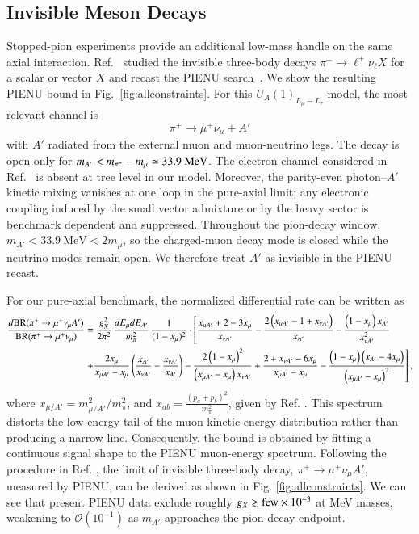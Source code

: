 \documentclass[onecolumn, aps, nofootinbib, prd, preprint, floats, floatfix, amsmath, amssymb, superscriptaddress, preprintnumbers]{revtex4-2}
\begin{document}
\subsection{Invisible Meson Decays}
\label{subsec:pion-invisible}

Stopped-pion experiments provide an additional low-mass handle on the same axial interaction. Ref.~\cite{Altmannshofer:2026opc} studied the invisible three-body decays $\pi^+\to \ell^+\nu_\ell X$ for a scalar or vector $X$ and recast the PIENU search~\cite{PIENU:2021clt}. We show the resulting PIENU bound in Fig.~\ref{fig:allconstraints}. For this $U_A(1)_{L_\mu-L_\tau}$ model, the most relevant channel is
\begin{equation}
    \pi^+\to \mu^+ \nu_\mu +A'
\end{equation}
with $A'$ radiated from the external muon and muon-neutrino legs. The decay is open only for $m_{A'}<m_{\pi^+}-m_\mu\simeq33.9~{\rm MeV}$. The electron channel considered in Ref.~\cite{Altmannshofer:2026opc} is absent at tree level in our model. Moreover, the parity-even photon--$A'$ kinetic mixing vanishes at one loop in the pure-axial limit; any electronic coupling induced by the small vector admixture or by the heavy sector is benchmark dependent and suppressed. Throughout the pion-decay window, $m_{A'}<33.9~\mathrm{MeV}<2m_\mu$, so the charged-muon decay mode is closed while the neutrino modes remain open. We therefore treat $A'$ as invisible in the PIENU recast.


For our pure-axial benchmark, the normalized differential rate can be written as \cite{Altmannshofer:2026opc}
\begin{equation}\label{eq:pion-axial-spectrum}
\begin{aligned}
\frac{d{\rm BR}(\pi^+\to\mu^+\nu_\mu A')}
{{\rm BR}(\pi^+\to\mu^+\nu_\mu)}
&=\frac{g_X^2}{2\pi^2}\,
\frac{dE_\mu dE_{A'}}{m_\pi^2}\,
\frac{1}{(1-x_\mu)^2}\cdot \left[\frac{x_{\mu A'}+2-3 x_{\mu}}{x_{\nu A'}}-\frac{2\left(x_{\mu A'}-1+x_{\nu A'}\right)}{x_{A'}}-\frac{\left(1-x_{\mu}\right) x_{A'}}{x_{\nu A'}^2}\right.\\
& \left. +\frac{2 x_{\mu}}{x_{\mu A'}-x_{\mu}}\left(\frac{x_{A'}}{x_{\nu A'}}-\frac{x_{\nu A'}}{x_{A'}}\right) -\frac{2\left(1-x_{\mu}\right)^2}{\left(x_{\mu A'}-x_{\mu}\right) x_{\nu A'}}+\frac{2+x_{\nu A'}-6 x_{\mu}}{x_{\mu A'}-x_{\mu}}-\frac{\left(1-x_{\mu}\right)\left(x_{A'}-4 x_{\mu}\right)}{\left(x_{\mu A'}-x_{\mu}\right)^2}\right],
\end{aligned}
\end{equation}
where $x_{\mu/A'}=m_{\mu/A'}^2/m_\pi^2$, and $x_{a b}=\frac{(p_a+p_b)^2}{m_\pi^2}$, given by Ref. \cite{Altmannshofer:2026opc}. This spectrum distorts the low-energy tail of the muon kinetic-energy distribution rather than producing a narrow line. Consequently, the bound is obtained by fitting a continuous signal shape to the PIENU muon-energy spectrum. Following the procedure in Ref. \cite{Altmannshofer:2026opc}, the limit of invisible three-body decay, $\pi^+\to\mu^+\nu_\mu A'$, measured by PIENU, can be derived as shown in Fig. \ref{fig:allconstraints}.
We can see that present PIENU data exclude roughly $g_X\gtrsim{\rm few}\times10^{-3}$ at MeV masses, weakening to $\mathcal O(10^{-1})$ as $m_{A'}$ approaches the pion-decay endpoint.
\end{document}
